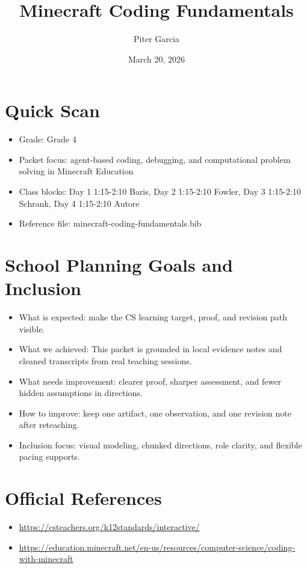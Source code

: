 \documentclass[11pt]{article}
\title{Minecraft Coding Fundamentals}
\author{Piter Garcia}
\date{March 20, 2026}
\begin{document}
\maketitle
\section*{Quick Scan}
\begin{itemize}[leftmargin=*]
\item Grade: Grade 4
\item Packet focus: agent-based coding, debugging, and computational problem solving in Minecraft Education
\item Class blocks: Day 1 1:15-2:10 Baris, Day 2 1:15-2:10 Fowler, Day 3 1:15-2:10 Schrank, Day 4 1:15-2:10 Autore
\item Reference file: minecraft-coding-fundamentals.bib
\end{itemize}
\section*{School Planning Goals and Inclusion}
\begin{itemize}[leftmargin=*]
\item What is expected: make the CS learning target, proof, and revision path visible.
\item What we achieved: This packet is grounded in local evidence notes and cleaned transcripts from real teaching sessions.
\item What needs improvement: clearer proof, sharper assessment, and fewer hidden assumptions in directions.
\item How to improve: keep one artifact, one observation, and one revision note after reteaching.
\item Inclusion focus: visual modeling, chunked directions, role clarity, and flexible pacing supports.
\end{itemize}
\section*{Official References}
\begin{itemize}[leftmargin=*]
\item \url{https://csteachers.org/k12standards/interactive/}
\item \url{https://education.minecraft.net/en-us/resources/computer-science/coding-with-minecraft}
\end{itemize}
\end{document}

